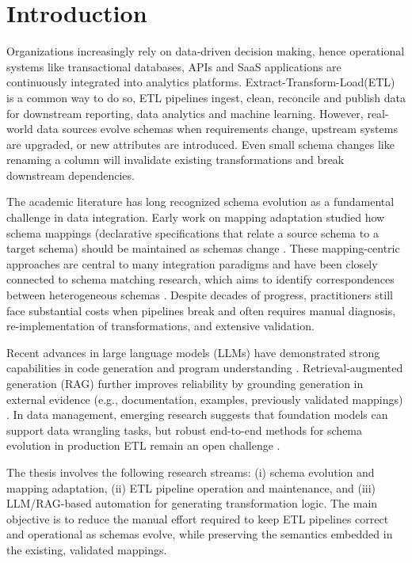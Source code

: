 \section{Introduction}
\label{sec:intro-background}

Organizations increasingly rely on data-driven decision making, hence operational systems like transactional databases, APIs and SaaS applications are continuously integrated into analytics platforms. Extract-Transform-Load(ETL) is a common way to do so, ETL pipelines ingest, clean, reconcile and publish data for downstream reporting, data analytics and machine learning. However, real-world data sources evolve schemas when requirements change, upstream systems are upgraded, or new attributes are introduced. Even small schema changes like renaming a column will invalidate existing transformations and break downstream dependencies.

The academic literature has long recognized schema evolution as a fundamental challenge in data integration. Early work on mapping adaptation studied how schema mappings (declarative specifications that relate a source schema to a target schema) should be maintained as schemas change \cite{velegrakis2003mapping,yu2005semantic}. These mapping-centric approaches are central to many integration paradigms and have been closely connected to schema matching research, which aims to identify correspondences between heterogeneous schemas \cite{rahm2001survey}. Despite decades of progress, practitioners still face substantial costs when pipelines break and often requires manual diagnosis, re-implementation of transformations, and extensive validation.

Recent advances in large language models (LLMs) have demonstrated strong capabilities in code generation and program understanding \cite{chen2021evaluating}. Retrieval-augmented generation (RAG) further improves reliability by grounding generation in external evidence (e.g., documentation, examples, previously validated mappings) \cite{lewis2020retrieval}. In data management, emerging research suggests that foundation models can support data wrangling tasks, but robust end-to-end methods for schema evolution in production ETL remain an open challenge \cite{narayan2022foundation}.

The thesis involves the following research streams: (i) schema evolution and mapping adaptation, (ii) ETL pipeline operation and maintenance, and (iii) LLM/RAG-based automation for generating transformation logic. The main objective is to reduce the manual effort required to keep ETL pipelines correct and operational as schemas evolve, while preserving the semantics embedded in the existing, validated mappings.

